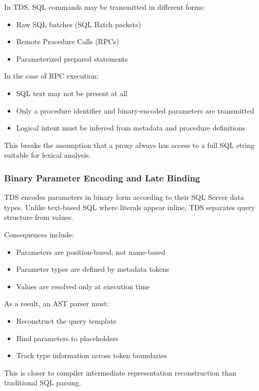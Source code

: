 In TDS, SQL commands may be transmitted in different forms:

\begin{itemize}
    \item Raw SQL batches (SQL Batch packets)
    \item Remote Procedure Calls (RPCs)
    \item Parameterized prepared statements
\end{itemize}

In the case of RPC execution:
\begin{itemize}
    \item SQL text may not be present at all
    \item Only a procedure identifier and binary-encoded parameters are transmitted
    \item Logical intent must be inferred from metadata and procedure definitions
\end{itemize}

This breaks the assumption that a proxy always has access to a full SQL string suitable for lexical analysis.

\subsubsection{Binary Parameter Encoding and Late Binding}

TDS encodes parameters in binary form according to their SQL Server data types. Unlike text-based SQL where literals appear inline, TDS separates query structure from values.

Consequences include:
\begin{itemize}
    \item Parameters are position-based, not name-based
    \item Parameter types are defined by metadata tokens
    \item Values are resolved only at execution time
\end{itemize}

As a result, an AST parser must:
\begin{itemize}
    \item Reconstruct the query template
    \item Bind parameters to placeholders
    \item Track type information across token boundaries
\end{itemize}

This is closer to compiler intermediate representation reconstruction than traditional SQL parsing.

